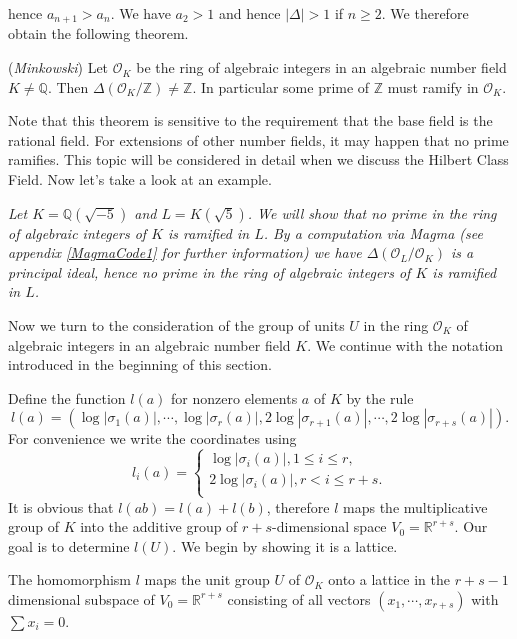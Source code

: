 hence $a_{n+1}>a_n$. We have $a_2>1$ and hence $|\Delta|>1$ if $n\ge 2$. We therefore obtain the following theorem.
\begin{theorem}(\textit{Minkowski})
Let $\mathcal{O}_K$ be the ring of algebraic integers in an algebraic number field $K\ne\mathbb{Q}$. Then $\Delta(\mathcal{O}_K/\mathbb{Z})\ne\mathbb{Z}$. In particular some prime of $\mathbb{Z}$ must ramify in $\mathcal{O}_K$.
\end{theorem}
Note that this theorem is sensitive to the requirement that the base field is the rational field. For extensions of other number fields, it may happen that no prime ramifies. This topic will be considered in detail when we discuss the Hilbert Class Field. Now let's take a look at an example.
\begin{example}\em\label{Magma1}
Let $K=\mathbb{Q}(\sqrt{-5})$ and $L=K(\sqrt{5})$. We will show that no prime in the ring of algebraic integers of $K$ is ramified in $L$. By a computation via Magma (see appendix \ref{MagmaCode1} for further information) we have $\Delta(\mathcal{O}_L/\mathcal{O}_K)$ is a principal ideal, hence no prime in the ring of algebraic integers of $K$ is ramified in $L$.
\end{example}
Now we turn to the consideration of the group of units $U$ in the ring $\mathcal{O}_K$ of algebraic integers in an algebraic number field $K$. We continue with the notation introduced in the beginning of this section.\par
Define the function $l(a)$ for nonzero elements $a$ of $K$ by the rule 
$$
l\left( a \right) =\left( \log \left| \sigma _1\left( a \right) \right|,\cdots ,\log \left| \sigma _r\left( a \right) \right|,2\log \left| \sigma _{r+1}\left( a \right) \right|,\cdots ,2\log \left| \sigma _{r+s}\left( a \right) \right| \right) .
$$
For convenience we write the coordinates using 
$$
l_i\left( a \right) =\begin{cases}
	\log \left| \sigma _i\left( a \right) \right|,1\le i\le r,\\
	2\log \left| \sigma _i\left( a \right) \right|,r<i\le r+s.\\
\end{cases}
$$
It is obvious that $l(ab)=l(a)+l(b)$, therefore $l$ maps the multiplicative group of $K$ into the additive group of $r+s$-dimensional space $V_0=\mathbb{R}^{r+s}$. Our goal is to determine $l(U)$. We begin by showing it is  a lattice.
\begin{proposition}\label{lUlattice1}
The homomorphism $l$ maps the unit group $U$ of $\mathcal{O}_K$ onto a lattice in the $r+s-1$ dimensional subspace of $V_0=\mathbb{R}^{r+s}$ consisting of all vectors $(x_1,\cdots,x_{r+s})$ with $\sum x_i=0$.
\end{proposition}
